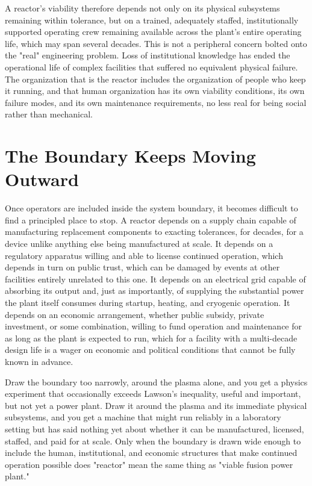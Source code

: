 A reactor's viability therefore depends not only on its physical subsystems remaining within tolerance, but on a trained, adequately staffed, institutionally supported operating crew remaining available across the plant's entire operating life, which may span several decades. This is not a peripheral concern bolted onto the "real" engineering problem. Loss of institutional knowledge has ended the operational life of complex facilities that suffered no equivalent physical failure. The organization that is the reactor includes the organization of people who keep it running, and that human organization has its own viability conditions, its own failure modes, and its own maintenance requirements, no less real for being social rather than mechanical.

\section{The Boundary Keeps Moving Outward}

Once operators are included inside the system boundary, it becomes difficult to find a principled place to stop. A reactor depends on a supply chain capable of manufacturing replacement components to exacting tolerances, for decades, for a device unlike anything else being manufactured at scale. It depends on a regulatory apparatus willing and able to license continued operation, which depends in turn on public trust, which can be damaged by events at other facilities entirely unrelated to this one. It depends on an electrical grid capable of absorbing its output and, just as importantly, of supplying the substantial power the plant itself consumes during startup, heating, and cryogenic operation. It depends on an economic arrangement, whether public subsidy, private investment, or some combination, willing to fund operation and maintenance for as long as the plant is expected to run, which for a facility with a multi-decade design life is a wager on economic and political conditions that cannot be fully known in advance.

Draw the boundary too narrowly, around the plasma alone, and you get a physics experiment that occasionally exceeds Lawson's inequality, useful and important, but not yet a power plant. Draw it around the plasma and its immediate physical subsystems, and you get a machine that might run reliably in a laboratory setting but has said nothing yet about whether it can be manufactured, licensed, staffed, and paid for at scale. Only when the boundary is drawn wide enough to include the human, institutional, and economic structures that make continued operation possible does "reactor" mean the same thing as "viable fusion power plant."

